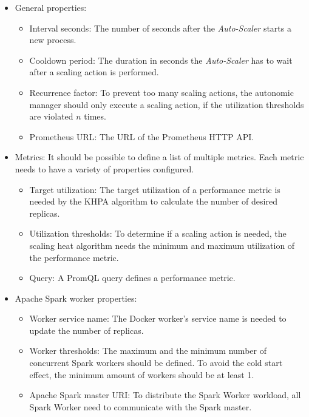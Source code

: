 \begin{itemize}
\item General properties:
\begin{itemize}
\item Interval seconds: The number of seconds after the \textit{Auto-Scaler} starts a new process.

\item Cooldown period: The duration in seconds the \textit{Auto-Scaler} has to wait after a scaling action is performed.

\item Recurrence factor: To prevent too many scaling actions,  the autonomic manager should only execute a scaling action,  if the utilization thresholds are violated $n$ times.

\item Prometheus URL: The URL of the Prometheus HTTP API.
\end{itemize}

\item Metrics:
It should be possible to define a list of multiple metrics. Each metric needs to have a variety of properties configured.
\begin{itemize}
\item Target utilization: The target utilization of a performance metric is needed by the KHPA algorithm to calculate the number of desired replicas.

\item Utilization thresholds: To determine if a scaling action is needed, the scaling heat algorithm needs the minimum and maximum utilization of the performance metric.

\item Query: A PromQL query defines a performance metric.
\end{itemize}

\item Apache Spark worker properties:
\begin{itemize}
\item Worker service name: The Docker worker's service name is needed to update the number of replicas.

\item Worker thresholds: The maximum and the minimum number of concurrent Spark workers should be defined. To avoid the cold start effect, the minimum amount of workers should be at least 1. 

\item Apache Spark master URI: To distribute the Spark Worker workload, all Spark Worker need to communicate with the Spark master.
\end{itemize}
\end{itemize}


